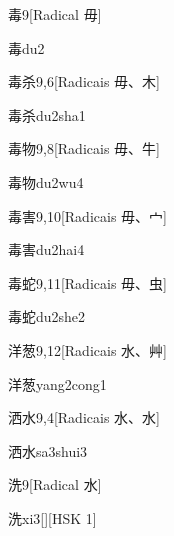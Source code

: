 \begin{entry}{毒}{9}[Radical ⽏]
  \begin{phonetics}{毒}{du2}
  \end{phonetics}
\end{entry}

\begin{entry}{毒杀}{9,6}[Radicais ⽏、⽊]
  \begin{phonetics}{毒杀}{du2sha1}
  \end{phonetics}
\end{entry}

\begin{entry}{毒物}{9,8}[Radicais ⽏、⽜]
  \begin{phonetics}{毒物}{du2wu4}
  \end{phonetics}
\end{entry}

\begin{entry}{毒害}{9,10}[Radicais ⽏、⼧]
  \begin{phonetics}{毒害}{du2hai4}
  \end{phonetics}
\end{entry}

\begin{entry}{毒蛇}{9,11}[Radicais ⽏、⾍]
  \begin{phonetics}{毒蛇}{du2she2}
  \end{phonetics}
\end{entry}

\begin{entry}{洋葱}{9,12}[Radicais ⽔、⾋]
  \begin{phonetics}{洋葱}{yang2cong1}
  \end{phonetics}
\end{entry}

\begin{entry}{洒水}{9,4}[Radicais ⽔、⽔]
  \begin{phonetics}{洒水}{sa3shui3}
  \end{phonetics}
\end{entry}

\begin{entry}{洗}{9}[Radical ⽔]
  \begin{phonetics}{洗}{xi3}[][HSK 1]
  \end{phonetics}
\end{entry}

